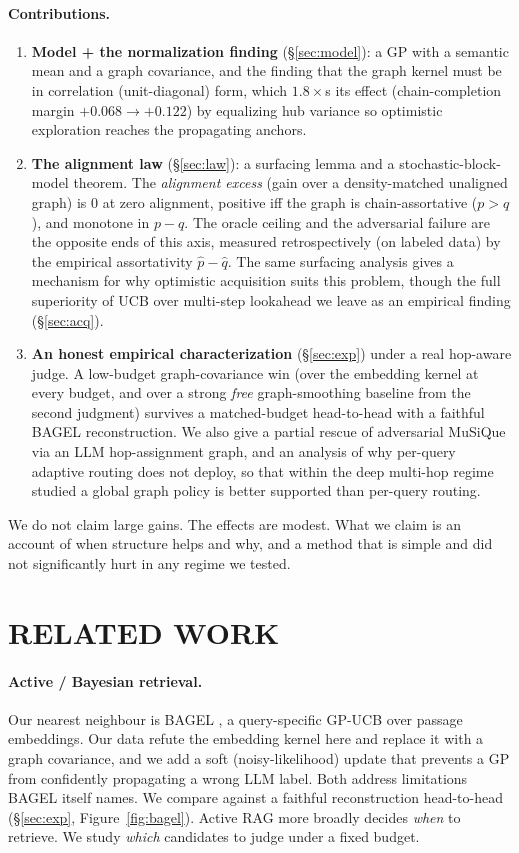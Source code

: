 \documentclass[twoside]{article}
\theoremstyle{plain}
\theoremstyle{definition}
\begin{document}
\paragraph{Contributions.}
\begin{enumerate}[leftmargin=*,itemsep=1pt,topsep=2pt]
\item \textbf{Model + the normalization finding} (\S\ref{sec:model}): a GP with a semantic mean and a graph
covariance, and the finding that the graph kernel must be in correlation (unit-diagonal) form, which
$1.8\times$s its effect (chain-completion margin $+0.068\to+0.122$) by equalizing hub variance so optimistic
exploration reaches the propagating anchors.
\item \textbf{The alignment law} (\S\ref{sec:law}): a surfacing lemma and a stochastic-block-model theorem. The
\emph{alignment excess} (gain over a density-matched unaligned graph) is $0$ at zero alignment, positive iff the
graph is chain-assortative ($p>q$), and monotone in $p-q$. The oracle ceiling and the adversarial failure are the
opposite ends of this axis, measured retrospectively (on labeled data) by the empirical assortativity $\hat p-\hat q$. The same surfacing analysis gives a mechanism for why optimistic acquisition suits
this problem, though the full superiority of UCB over multi-step lookahead we leave as an empirical finding
(\S\ref{sec:acq}).
\item \textbf{An honest empirical characterization} (\S\ref{sec:exp}) under a real hop-aware judge. A low-budget
graph-covariance win (over the embedding kernel at every budget, and over a strong \emph{free} graph-smoothing
baseline from the second judgment) survives a matched-budget head-to-head with a faithful BAGEL reconstruction. We
also give a partial rescue of adversarial MuSiQue via an LLM hop-assignment graph, and an analysis of why per-query
adaptive routing does not deploy, so that within the deep multi-hop regime studied a global graph policy is better
supported than per-query routing.
\end{enumerate}
We do not claim large gains. The effects are modest. What we claim is an account of when structure helps and why,
and a method that is simple and did not significantly hurt in any regime we tested.

\section{RELATED WORK}\label{sec:rel}
\paragraph{Active / Bayesian retrieval.} Our nearest neighbour is BAGEL \citep{bagel2026}, a query-specific
GP-UCB \citep{srinivas2010gpucb} over passage embeddings. Our data refute the embedding kernel here and replace it
with a graph covariance, and we add a soft (noisy-likelihood) update that prevents a GP from confidently
propagating a wrong LLM label. Both address limitations BAGEL itself names. We compare against a faithful reconstruction
head-to-head (\S\ref{sec:exp}, Figure~\ref{fig:bagel}). Active RAG more broadly \citep{jiang2023flare} decides
\emph{when} to retrieve. We study \emph{which} candidates to judge under a fixed budget.
\end{document}
